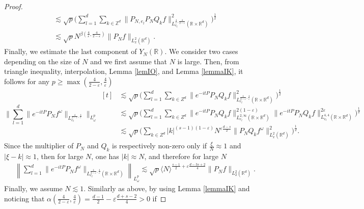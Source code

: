 \documentclass[aihp]{imsart}
\numberwithin{equation}{section}
\theoremstyle{plain}
\theoremstyle{remark}
\newcommand{\R}{\mathbb{R}}
\newcommand{\Z}{\mathbb{Z}}
\begin{document}
\begin{proof}
\begin{equation*}
\begin{aligned}
 &\lesssim \sqrt{p} \bigg( \sum_{l = 1}^d \sum_{k \in \Z^d} \|P_{N,e_l} P_N Q_k f \|^2_{L^{\frac{4}{\varepsilon},\frac{4}{2-\varepsilon}}_{e_l} (\R\times \R^d)} \bigg)^{\frac{1}{2}} \\
& \lesssim \sqrt{p}N^{\beta (\frac{4}{\varepsilon},\frac{4}{2-\varepsilon})} \|P_N f\|_{L_x^2 (\R^d )}.
\end{aligned}
\end{equation*}
Finally, we estimate the last component of $Y_N (\R)$. We consider two cases depending on the size of $N$ and we first  assume that $N$ is large. Then,
from triangle inequality, interpolation,  Lemma \ref{lemIO}, and Lemma \ref{lemmaIK}, it follows for any $p \geq \max (\frac{4}{2-\varepsilon},\frac{4}{\varepsilon})$
\begin{equation*}
\bigg\|\sum_{l=1}^d\|e^{-it P}  P_N f^\omega \|_{ L^{\frac{4}{2-\varepsilon},\frac{4}{\varepsilon}}_{e_l} } \bigg\|_{L^p_\omega}
\begin{aligned}[t]
& \lesssim \sqrt{p} \bigg(\sum_{l=1}^d \sum_{k \in Z^d} \| e^{-it P}  P_N Q_k f \|^2_{L^{\frac{4}{2-\varepsilon},\frac{4}{\varepsilon}}_{e_l} (\R\times \R^d)}\bigg)^{\frac{1}{2}}\\
&\lesssim  \sqrt{p} \bigg(\sum_{l=1}^d \sum_{k \in Z^d} \|e^{-it P}  P_N Q_k f\|_{L^{2,\infty}_{e_l} (\R \times \R^d)}^{2(1-\varepsilon)} \|e^{-it P}  P_N Q_k f\|_{L^{4,4}_{e_l}(\R \times \R^d) }^{2\varepsilon} 
\bigg)^{\frac{1}{2}}\\
&\lesssim\sqrt{p} \bigg( \sum_{k \in Z^d} |k|^{(s-1)(1-\varepsilon)} N^{\varepsilon \frac{d -s}{2} } \|P_N Q_k f^\omega\|^2_{L_x^2 (\R^d)} \bigg)^{\frac{1}{2}}.
\end{aligned}
\end{equation*}
Since the multiplier of $P_N$ and $Q_k$ is respectively non-zero only if $\frac{\xi}{N} \approx 1$ and $|\xi - k| \approx 1$, then for large $N$, one has $|k|\approx N$, and therefore 
for large $N$
\begin{align*}
&\left\|\sum_{l=1}^d \|e^{-it P}  P_N f^\omega \|_{  L^{\frac{4}{2-\varepsilon},\frac{4}{\varepsilon}}_{e_l} (\R\times \R^d)} \right\|_{L_\omega^p}
\lesssim \sqrt{p}\langle N\rangle^{\frac{s-1}{2} + \varepsilon  \frac{d -3s+2}{4}} \|P_N f\|_{L_2^2 (\R^d )}.
\end{align*}
Finally, we assume $N \lesssim 1$. Similarly as above, by using Lemma \ref{lemmaIK} and noticing that $\alpha (\frac{4}{2-\varepsilon},\frac{4}{\varepsilon} )= \frac{d-1}{2}- \varepsilon \frac{d+s -2}{4}>0$ if 

\end{proof}
\end{document}

